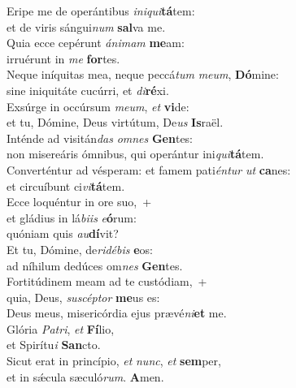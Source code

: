 \evenverse Eripe me de operántibus \textit{i}\textit{ni}\textit{qui}\textbf{tá}tem:~\*\\
\evenverse et de viris sángui\textit{num} \textbf{sal}va me.\\
\oddverse Quia ecce cepérunt \textit{á}\textit{ni}\textit{mam} \textbf{me}am:~\*\\
\oddverse irruérunt in \textit{me} \textbf{for}tes.\\
\evenverse Neque iníquitas mea, neque peccá\textit{tum} \textit{me}\textit{um}, \textbf{Dó}mine:~\*\\
\evenverse sine iniquitáte cucúrri, et \textit{di}\textbf{ré}xi.\\
\oddverse Exsúrge in occúrsum \textit{me}\textit{um}, \textit{et} \textbf{vi}de:~\*\\
\oddverse et tu, Dómine, Deus virtútum, De\textit{us} \textbf{Is}raël.\\
\evenverse Inténde ad visitán\textit{das} \textit{om}\textit{nes} \textbf{Gen}tes:~\*\\
\evenverse non misereáris ómnibus, qui operántur ini\textit{qui}\textbf{tá}tem.\\
\oddverse Converténtur ad vésperam: et famem pati\textit{én}\textit{tur} \textit{ut} \textbf{ca}nes:~\*\\
\oddverse et circuíbunt ci\textit{vi}\textbf{tá}tem.\\
\evenverse Ecce loquéntur in ore suo,~+\\
\evenverse  et gládius in lá\textit{bi}\textit{is} \textit{e}\textbf{ó}rum:~\*\\
\evenverse quóniam quis \textit{au}\textbf{dí}vit?\\
\oddverse Et tu, Dómine, de\textit{ri}\textit{dé}\textit{bis} \textbf{e}os:~\*\\
\oddverse ad níhilum dedúces om\textit{nes} \textbf{Gen}tes.\\
\evenverse Fortitúdinem meam ad te custódiam,~+\\
\evenverse  quia, Deus, \textit{su}\textit{scép}\textit{tor} \textbf{me}us es:~\*\\
\evenverse Deus meus, misericórdia ejus prævé\textit{ni}\textbf{et} me.\\
\oddverse Glória \textit{Pa}\textit{tri}, \textit{et} \textbf{Fí}lio,~\*\\
\oddverse et Spirítu\textit{i} \textbf{San}cto.\\
\evenverse Sicut erat in princípio, \textit{et} \textit{nunc}, \textit{et} \textbf{sem}per,~\*\\
\evenverse et in sǽcula sæculó\textit{rum}. \textbf{A}men.\\
